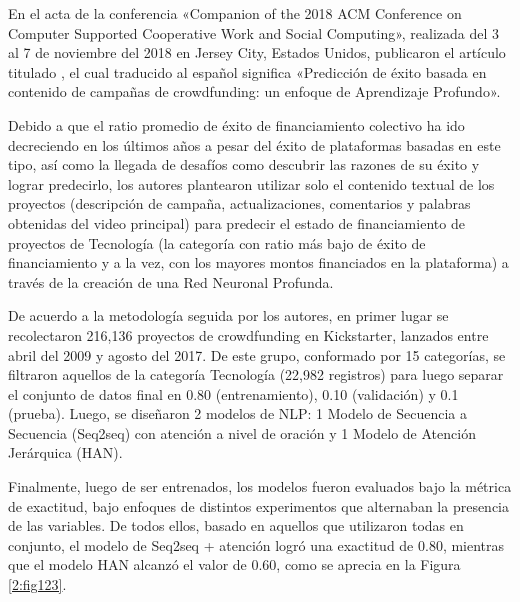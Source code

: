 \clearpage
En el acta de la conferencia «Companion of the 2018 ACM Conference on Computer Supported Cooperative Work and Social Computing», realizada  del 3 al 7 de noviembre del 2018 en Jersey City, Estados Unidos, \cite{pr_lee2018contentDL} publicaron el artículo titulado , el cual traducido al español significa «Predicción de éxito basada en contenido de campañas de crowdfunding: un enfoque de Aprendizaje Profundo».

Debido a que el ratio promedio de éxito de financiamiento colectivo ha ido decreciendo en los últimos años a pesar del éxito de plataformas basadas en este tipo, así como la llegada de desafíos como descubrir las razones de su éxito y lograr predecirlo, los autores plantearon utilizar solo el contenido textual de los proyectos (descripción de campaña, actualizaciones, comentarios y palabras obtenidas del video principal) para predecir el estado de financiamiento de proyectos de Tecnología (la categoría con ratio más bajo de éxito de financiamiento y a la vez, con los mayores montos financiados en la plataforma) a través de la creación de una Red Neuronal Profunda.

De acuerdo a la metodología seguida por los autores, en primer lugar se recolectaron 216,136 proyectos de crowdfunding en Kickstarter, lanzados entre abril del 2009 y agosto del 2017. De este grupo, conformado por 15 categorías, se filtraron aquellos de la categoría Tecnología (22,982 registros) para luego separar el conjunto de datos final en 0.80 (entrenamiento), 0.10 (validación) y 0.1 (prueba). Luego, se diseñaron 2 modelos de NLP: 1 Modelo de Secuencia a Secuencia (Seq2seq) con atención a nivel de oración y 1 Modelo de Atención Jerárquica (HAN).

Finalmente, luego de ser entrenados, los modelos fueron evaluados bajo la métrica de exactitud, bajo enfoques de distintos experimentos que alternaban la presencia de las variables. De todos ellos, basado en aquellos que utilizaron todas en conjunto, el modelo de Seq2seq + atención logró una exactitud de 0.80, mientras que el modelo HAN alcanzó el valor de 0.60, como se aprecia en la Figura \ref{2:fig123}.


